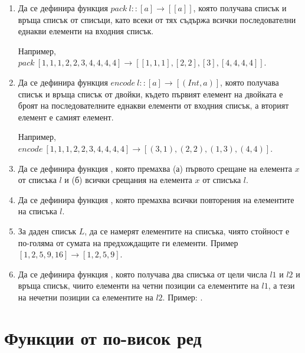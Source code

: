 \begin{enumerate}[]
	\item Да се дефинира функция $pack \: l :: [a] \rightarrow [[a]]$, която получава списък и връща списък от списъци, като всеки от тях съдържа всички последователни еднакви елементи на входния списък.
	
	Например, $pack \: [1,1,1,2,2,3,4,4,4,4] \rightarrow [[1,1,1],[2,2],[3],[4,4,4,4]]$.

	\item Да се дефинира функция $encode \: l :: [a] \rightarrow [(Int,a)]$, която получава списък и връща списък от двойки, където първият елемент на двойката е броят на последователните еднакви елементи от входния списък, а вторият елемент е самият елемент.
	
	Например, $encode \: [1,1,1,2,2,3,4,4,4,4] \rightarrow [(3,1),(2,2),(1,3),(4,4)]$.

	\item Да се дефинира функция , която премахва (а) първото срещане на елемента $x$ от списъка $l$ и (б) всички срещания на елемента $x$ от списъка $l$.
		
	\item Да се дефинира функция , която премахва всички повторения на елементите на списъка $l$.
	
	\item За даден списък $L$, да се намерят елементите на списъка, чиято стойност е по-голяма от сумата на предхождащите ги елементи. Пример $[1,2,5,9,16] \rightarrow [1,2,5,9]$.
	
	\item Да се дефинира функция , която получава два списъка от цели числа $l1$ и $l2$ и връща списък, чиито елементи на четни позиции са елементите на $l1$, а тези на нечетни позиции са елементите на $l2$. Пример: .


\end{enumerate}

\section {Функции от по-висок ред}

